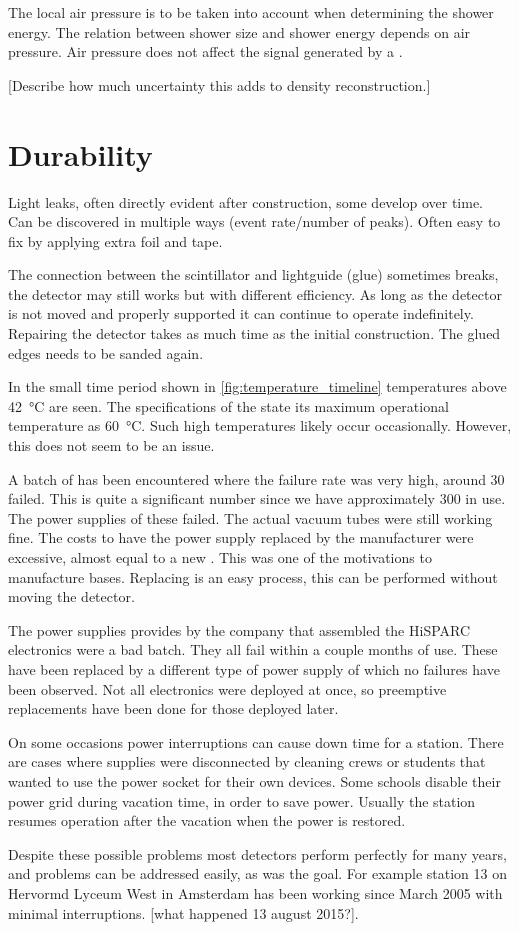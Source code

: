 The local air pressure is to be taken into account when determining the shower energy. The relation between shower size and shower energy depends on air pressure. Air pressure does not affect the signal generated by a \mip.

[Describe how much uncertainty this adds to density reconstruction.]


\section{Durability}
\label{sec:detector-durability}

Light leaks, often directly evident after construction, some develop over time. Can be discovered in multiple ways (event rate/number of peaks). Often easy to fix by applying extra foil and tape.

The connection between the scintillator and lightguide (glue) sometimes breaks, the detector may still works but with different efficiency. As long as the detector is not moved and properly supported it can continue to operate indefinitely. Repairing the detector takes as much time as the initial construction. The glued edges needs to be sanded again.

In the small time period shown in \cref{fig:temperature_timeline} temperatures above \SI{42}{\degreeCelsius} are seen. The specifications of the \pmt state its maximum operational temperature as \SI{60}{\degreeCelsius}. Such high temperatures likely occur occasionally. However, this does not seem to be an issue.

A batch of \pmts has been encountered where the failure rate was very high, around 30 \pmts failed. This is quite a significant number since we have approximately 300 \pmts in use. The power supplies of these \pmts failed. The actual vacuum tubes were still working fine. The costs to have the power supply replaced by the manufacturer were excessive, almost equal to a new \pmt. This was one of the motivations to manufacture \pmt bases. Replacing \pmts is an easy process, this can be performed without moving the detector.

The power supplies provides by the company that assembled the HiSPARC electronics were a bad batch. They all fail within a couple months of use. These have been replaced by a different type of power supply of which no failures have been observed. Not all electronics were deployed at once, so preemptive replacements have been done for those deployed later.

On some occasions power interruptions can cause down time for a station.  There are cases where supplies were disconnected by cleaning crews or students that wanted to use the power socket for their own devices. Some schools disable their power grid during vacation time, in order to save power. Usually the station resumes operation after the vacation when the power is restored.

Despite these possible problems most detectors perform perfectly for many years, and problems can be addressed easily, as was the goal. For example station 13 on Hervormd Lyceum West in Amsterdam has been working since March 2005 with minimal interruptions. [what happened 13 august 2015?].
